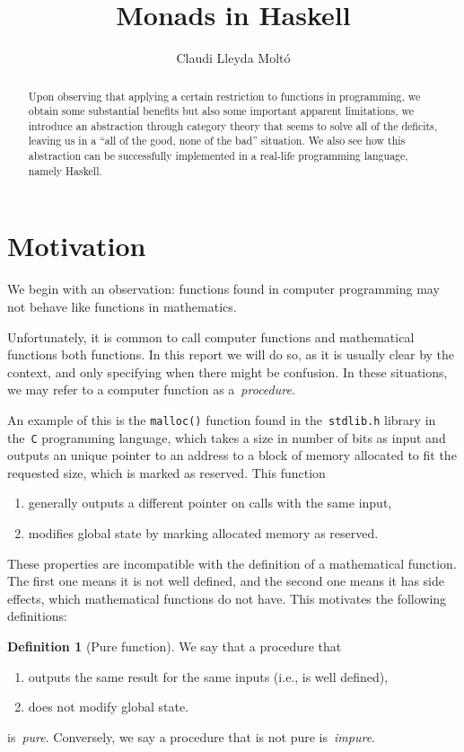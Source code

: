 \documentclass[a4paper]{article}
\title{Monads in Haskell}
\author{Claudi Lleyda Moltó}
\date{}
\theoremstyle{plain}
\theoremstyle{definition}
\newtheorem{definition}[theorem]{Definition}
\newcommand{\ie}{{i}.{e}., }
\begin{document}
\maketitle
\begin{abstract}
    Upon observing that applying a certain restriction to functions in
    programming, we obtain some substantial benefits but also some important
    apparent limitations, we introduce an abstraction through category theory
    that seems to solve all of the deficits, leaving us in a ``all of the good,
    none of the bad'' situation. We also see how this abstraction can be
    successfully implemented in a real-life programming language, namely
    Haskell.
\end{abstract}
\tableofcontents
\clearpage

\section{Motivation}
\label{sec:motivation}
We begin with an observation: functions found in computer programming may not
behave like functions in mathematics.

Unfortunately, it is common to call computer functions and mathematical
functions both functions. In this report we will do so, as it is usually clear
by the context, and only specifying when there might be confusion. In these
situations, we may refer to a computer function as a~\emph{procedure}.

An example of this is the \texttt{malloc()} function found in
the~\texttt{stdlib.h} library in the~\texttt{C} programming
language, which takes a size in number of bits as input and outputs an unique
pointer to an address to a block of memory allocated to fit the requested size,
which is marked as reserved. This function

\begin{enumerate}
    \item generally outputs a different pointer on calls with the same input,
    \item modifies global state by marking allocated memory as reserved.
\end{enumerate}

These properties are incompatible with the definition of a mathematical
function. The first one means it is not well defined, and the second one means
it has side effects, which mathematical functions do not have. This motivates
the following definitions:

\begin{definition}[Pure function]
    We say that a procedure that
    \begin{enumerate}
        \item outputs the same result for the same inputs (\ie is well defined),
        \item does not modify global state.
    \end{enumerate}
    is~\emph{pure}.
    Conversely, we say a procedure that is not pure is~\emph{impure}.
\end{definition}
\end{document}
